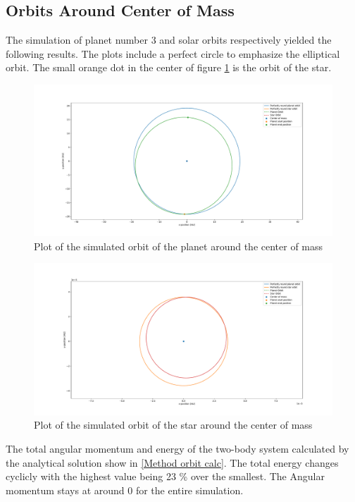 \documentclass[reprint,english,notitlepage]{revtex4-2}
\begin{document}
\subsection{Orbits Around Center of Mass}
	The simulation of planet number 3 and solar orbits respectively yielded the following results. The plots include a perfect circle to emphasize the elliptical orbit. The small orange dot in the center of figure \ref{fig: P_orbit_cm} is the orbit of the star. 
	\begin{figure}[h!]
	  \centering
	  \includegraphics[scale = .15]{Figures/Solar_Orbit_CM.pdf}
	  \caption{Plot of the simulated orbit of the planet around the center of mass}
	  \label{fig: P_orbit_cm}
	\end{figure}
	
	\begin{figure}[h!]
	  \centering
	  \includegraphics[scale = .15]{Figures/Solar_Orbit_CM_2.pdf}
	  \caption{Plot of the simulated orbit of the star around the center of mass}
	  \label{fig: S_orbit_cm}
	\end{figure}
	
	The total angular momentum and energy of the two-body system calculated by the analytical solution show in \ref{Method orbit calc}. The total energy changes cyclicly with the highest value being 23 \% over the smallest. The Angular momentum stays at around 0 for the entire simulation. 
	
\end{document}
